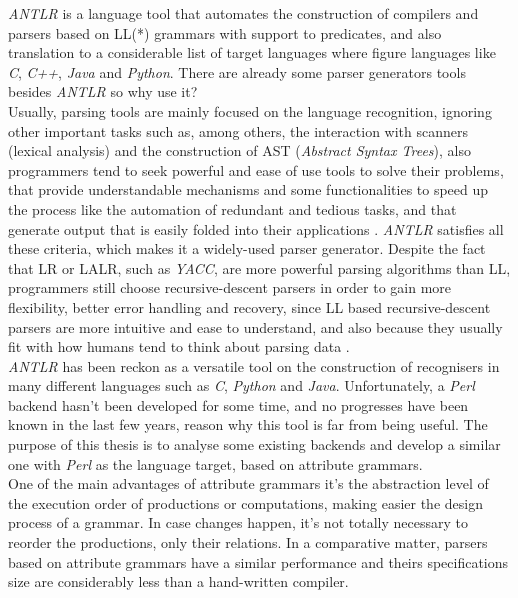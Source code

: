 \documentclass[a4paper,12pt]{article}
\begin{document}
\emph{ANTLR} is a language tool that automates the construction of compilers and parsers based on LL(*) grammars with support to predicates, and also translation to a considerable list of target languages where figure languages like \emph{C}, \emph{C++}, \emph{Java} and \emph{Python}. There are already some parser generators tools besides \emph{ANTLR} so why use it?\\[6pt]
Usually, parsing tools are mainly focused on the language recognition, ignoring other important tasks such as, among others, the interaction with scanners (lexical analysis) and the construction of AST (\emph{Abstract Syntax Trees}), also programmers tend to seek powerful and ease of use tools to solve their problems, that provide understandable mechanisms and some functionalities to speed up the process like the automation of redundant and tedious tasks, and that generate output that is easily folded into their applications \cite{PQ95}. \emph{ANTLR} satisfies all these criteria, which makes it a widely-used parser generator.
Despite the fact that LR or LALR, such as \emph{YACC}, are more powerful parsing algorithms than LL, programmers still choose recursive-descent parsers in order to gain more flexibility, better error handling and recovery, since LL based recursive-descent parsers are more intuitive and ease to understand, and also because they usually fit with how humans tend to think about parsing data \cite{Wai90}.\\[6pt]
\emph{ANTLR} has been reckon as a versatile tool on the construction of recognisers in many different languages such as \emph{C}, \emph{Python} and \emph{Java}.
Unfortunately, a \emph{Perl} backend hasn't been developed for some time, and no progresses have been known in the last few years, reason why this tool is far from being useful. The purpose of this thesis is to analyse some existing backends and develop a similar one with \emph{Perl} as the language target, based on attribute grammars.\\[6pt]
One of the main advantages of attribute grammars it's the abstraction level of the execution order of productions or computations, making easier the design process of a grammar. In case changes happen, it's not totally necessary to reorder the productions, only their relations. In a comparative matter, parsers based on attribute grammars have a similar performance and theirs specifications size are considerably less than a hand-written compiler.
\end{document}
